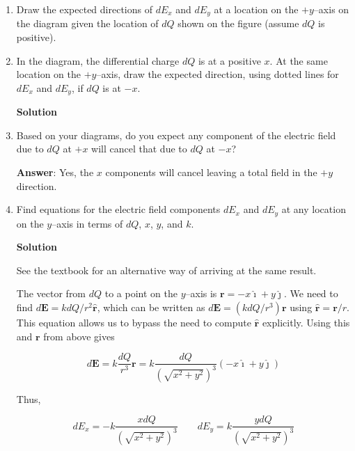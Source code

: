\documentclass{article}
\newcommand{\ds}[0]{\displaystyle}
\newcommand{\ihat}[0]{\hat{\boldsymbol{\imath}}}
\newcommand{\jhat}[0]{\hat{\boldsymbol{\jmath}}}
\newcommand{\rhat}[0]{\hat{\mathbf{r}}}
\begin{document}
\begin{enumerate}

  \item Draw the expected directions of $dE_x$ and $dE_y$ at a location on the $+y$--axis on the diagram given the location of $dQ$ shown on the figure (assume $dQ$ is positive).

  \item In the diagram, the differential charge $dQ$ is at a positive $x$. At the same location on the $+y$--axis, draw the expected direction, using dotted lines for $dE_x$ and $dE_y$, if $dQ$ is at $-x$.

        \ifsolutions
        \textbf{Solution}

        
        \fi

  \item Based on your diagrams, do you expect any component of the electric field due to $dQ$ at $+x$ will cancel that due to $dQ$ at $-x$?

        \ifsolutions
        \textbf{Answer}: Yes, the $x$ components will cancel leaving a total field in the $+y$ direction.
        \fi

  \item Find equations for the electric field components $dE_x$ and $dE_y$ at any location on the $y$--axis in terms of $dQ$, $x$, $y$, and $k$.

        \ifsolutions
        \textbf{Solution}

        See the textbook for an alternative way of arriving at the same result.

        The vector from $dQ$ to a point on the $y$--axis is $\mathbf{r}=-x\ihat+y\jhat$. We need to find $\ds d\mathbf{E} = k{dQ}/{r^2}\hat{\mathbf{r}}$, which can be written as $\ds d\mathbf{E}=( k{dQ}/{r^3})\mathbf{r}$ using $\rhat=\mathbf{r}/r$. This equation allows us to bypass the need to compute $\rhat$ explicitly. Using this and $\mathbf{r}$ from above gives

        \begin{equation}
        d\mathbf{E} = k\frac{dQ}{r^3}\mathbf{r} = k\frac{dQ}{(\sqrt{x^2+y^2})^3}(-x\ihat+y\jhat)
        \end{equation}

        Thus,

        \begin{equation}
        \ds dE_x = -k\frac{xdQ}{(\sqrt{x^2+y^2})^3}\qquad dE_y = k\frac{ydQ}{(\sqrt{x^2+y^2})^3}
        \end{equation}
        \else


\end{enumerate}
\end{document}
